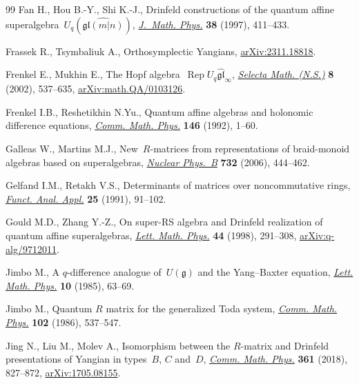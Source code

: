 \begin{thebibliography}{99}
Fan H., Hou B.-Y., Shi K.-J., Drinfeld constructions of the quantum affine
 superalgebra~{$U_q(\widehat {\mathfrak{gl}(m|n)})$}, \href{https://doi.org/10.1063/1.532188}{\textit{J.~Math. Phys.}}
 \textbf{38} (1997), 411--433.

Frassek R., Tsymbaliuk A., Orthosymplectic {Y}angians, \href{https://arxiv.org/abs/2311.18818}{arXiv:2311.18818}.

Frenkel E., Mukhin E., The {H}opf algebra~{$\operatorname{Rep} U_q\widehat{\mathfrak{gl}}_\infty$}, \href{https://doi.org/10.1007/PL00012603}{\textit{Selecta Math. (N.S.)}}
 \textbf{8} (2002), 537--635, \href{https://arxiv.org/abs/math.QA/0103126}{arXiv:math.QA/0103126}.

Frenkel I.B., Reshetikhin N.Yu., Quantum affine algebras and holonomic
 difference equations, \href{https://doi.org/10.1007/bf02099206}{\textit{Comm. Math. Phys.}} \textbf{146} (1992), 1--60.

Galleas W., Martins M.J., New~{$R$}-matrices from representations of
 braid-monoid algebras based on superalgebras, \href{https://doi.org/10.1016/j.nuclphysb.2005.10.025}{\textit{Nuclear Phys.~B}}
 \textbf{732} (2006), 444--462.

Gelfand I.M., Retakh V.S., Determinants of matrices over noncommutative rings,
 \href{https://doi.org/10.1007/BF01079588}{\textit{Funct. Anal. Appl.}} \textbf{25} (1991), 91--102.

Gould M.D., Zhang Y.-Z., On super-{RS} algebra and {D}rinfeld realization of
 quantum affine superalgebras, \href{https://doi.org/10.1023/A:1007494602290}{\textit{Lett. Math. Phys.}} \textbf{44} (1998),
 291--308, \href{https://arxiv.org/abs/q-alg/9712011}{arXiv:q-alg/9712011}.

Jimbo M., A {$q$}-difference analogue of~{$U(\mathfrak{g})$} and the
 {Y}ang--{B}axter equation, \href{https://doi.org/10.1007/BF00704588}{\textit{Lett. Math. Phys.}} \textbf{10} (1985),
 63--69.

Jimbo M., Quantum {$R$} matrix for the generalized {T}oda system, \href{https://doi.org/10.1007/BF01221646}{\textit{Comm.
 Math. Phys.}} \textbf{102} (1986), 537--547.

Jing N., Liu M., Molev A., Isomorphism between the $R$-matrix and Drinfeld
 presentations of {Y}angian in types~$B$, $C$ and~$D$, \href{https://doi.org/10.1007/s00220-018-3185-x}{\textit{Comm. Math.
 Phys.}} \textbf{361} (2018), 827--872, \href{https://arxiv.org/abs/1705.08155}{arXiv:1705.08155}.


\end{thebibliography}
